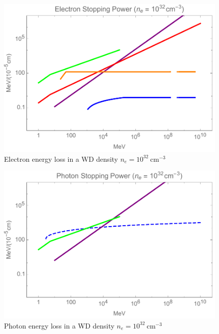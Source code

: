 \documentclass[twocolumn,showpacs,preprintnumbers,amsmath,amssymb,prd]{revtex4}
\begin{document}
\begin{figure}
\includegraphics[scale=.45]{SPelectron.pdf}
\caption{Electron energy loss in a WD density $n_e = 10^{32} ~\text{cm}^{-3}$}
\label{fig:SPelectron}
\end{figure}

\begin{figure}
\includegraphics[scale=.45]{SPphoton.pdf}
\caption{Photon energy loss in a WD density $n_e = 10^{32} ~\text{cm}^{-3}$}
\label{fig:SPphoton}
\end{figure}
\end{document}
